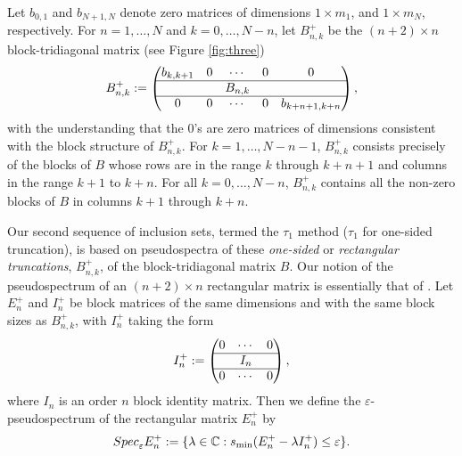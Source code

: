 \documentclass[preprint,1p,11pt]{elsarticle}
\newcommand\C{{\mathbb C}}
\newcommand\eps{{\varepsilon}}
\newcommand\Speps{{\rm Spec}_\eps}
\numberwithin{equation}{section}   %
\numberwithin{figure}{section}  %
\begin{document}
Let $b_{0,1}$ and $b_{N+1,N}$ denote zero matrices of dimensions $1\times m_1$, and $1\times m_N$, respectively. %
For $n=1,\ldots,N$ and $k=0,\ldots,N-n$, let 
$B^+_{n,k}$ %
be the $(n+2)\times n$ block-tridiagonal matrix (see Figure \ref{fig:three})
\begin{equation} \label{eq:Bn+}
B^+_{n,k} := \begin{pmatrix}
b_{k,k+1} & 0&\cdots&0& 0\\\hline
& & B_{n,k}\\\hline
0& 0 &\cdots&0 & b_{k+n+1,k+n}
\end{pmatrix}, %
\end{equation}
with the understanding that the $0$'s are zero matrices of dimensions consistent with the block structure of $B^+_{n,k}$. 
For $k=1,\ldots,N-n-1$,  $B_{n,k}^+$ %
consists precisely of the blocks of $B$ whose rows are in the range $k$ through $k+n+1$ and columns in the range $k+1$ to $k+n$. For all $k=0,\ldots,N-n$, $B^+_{n,k}$ contains all the non-zero blocks of $B$ in columns $k+1$ through $k+n$.  

Our second sequence of inclusion sets, termed the $\tau_1$ method ($\tau_1$ for one-sided truncation), is based on pseudospectra of these {\it one-sided} or {\it rectangular truncations}, $B^+_{n,k}$, of the block-tridiagonal matrix $B$. Our notion of the pseudospectrum of an $(n+2)\times n$ rectangular matrix is essentially that of \cite{WrightTrefethen,TrefEmbBook}. Let $E^+_n$ and $I_n^+$ be block matrices of the same dimensions and with the same block sizes as $B^+_{n,k}$, with $I_n^+$ taking the form 
\begin{equation} \label{eq:In+}
 I^+_n := \begin{pmatrix}
0&\cdots&0\\\hline
&I_n &\\\hline
0&\cdots&0
\end{pmatrix},
\end{equation}
where $I_n$ is an order $n$ block identity matrix. Then we define the $\eps$-pseudospectrum of the rectangular matrix $E^+_n$ by
\begin{equation} \label{eq:recteps}
\Speps E^+_n := \{\lambda\in \C: s_{\min}(E^+_n-\lambda I^+_n)\leq \eps\}.
\end{equation}
\end{document}

